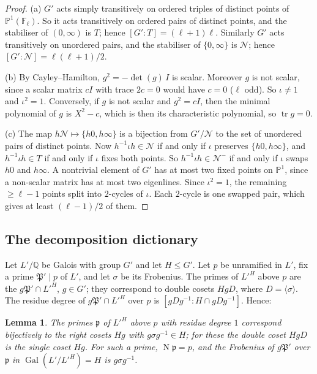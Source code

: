 \documentclass[11pt]{amsart}
\newtheorem{lemma}[theorem]{Lemma}
\theoremstyle{definition}
\theoremstyle{remark}
\newcommand{\Q}{\mathbb{Q}}
\newcommand{\F}{\mathbb{F}}
\newcommand{\PP}{\mathbb{P}}
\newcommand{\fp}{\mathfrak{p}}
\newcommand{\fP}{\mathfrak{P}}
\DeclareMathOperator{\Gal}{Gal}
\DeclareMathOperator{\tr}{tr}
\DeclareMathOperator{\Nm}{N}
\newcommand{\Nor}{\mathcal{N}}     %
\newcommand{\Nout}{\Nor^{-}}
\begin{document}
\begin{proof}
(a) $G'$ acts simply transitively on ordered triples of distinct points of $\PP^1(\F_\ell)$. So it acts transitively
on ordered pairs of distinct points, and the stabiliser of $(0,\infty)$ is $T$; hence $[G':T]=(\ell+1)\ell$. Similarly
$G'$ acts transitively on unordered pairs, and the stabiliser of $\{0,\infty\}$ is $\Nor$; hence $[G':\Nor]=\ell(\ell+1)/2$.

(b) By Cayley--Hamilton, $g^2=-\det(g)\,I$ is scalar. Moreover $g$ is not scalar, since a scalar matrix $cI$ with
trace $2c=0$ would have $c=0$ ($\ell$ odd). So $\iota\neq1$ and $\iota^2=1$. Conversely, if $g$ is not scalar and $g^2=cI$,
then the minimal polynomial of $g$ is $X^2-c$, which is then its characteristic polynomial, so $\tr g=0$.

(c) The map $h\Nor\mapsto\{h0,h\infty\}$ is a bijection from $G'/\Nor$ to the set of unordered pairs of distinct points.
Now $h^{-1}\iota h\in\Nor$ if and only if $\iota$ preserves $\{h0,h\infty\}$, and $h^{-1}\iota h\in T$ if and only if
$\iota$ fixes both points. So $h^{-1}\iota h\in\Nout$ if and only if $\iota$ swaps $h0$ and $h\infty$. A nontrivial
element of $G'$ has at most two fixed points on $\PP^1$, since a non-scalar matrix has at most two eigenlines. Since
$\iota^2=1$, the remaining $\ge\ell-1$ points split into $2$-cycles of $\iota$. Each $2$-cycle is one swapped pair,
which gives at least $(\ell-1)/2$ of them.
\end{proof}

\subsection{The decomposition dictionary}

Let $L'/\Q$ be Galois with group $G'$ and let $H\le G'$. Let $p$ be unramified in $L'$, fix a prime $\fP'\mid p$ of
$L'$, and let $\sigma$ be its Frobenius. The primes of $L'^H$ above $p$ are the $g\fP'\cap L'^H$, $g\in G'$; they
correspond to double cosets $HgD$, where $D=\langle\sigma\rangle$. The residue degree of $g\fP'\cap L'^H$ over $p$ is
$[gDg^{-1}:H\cap gDg^{-1}]$. Hence:

\begin{lemma}\label{lem:dict}
The primes $\fp$ of $L'^H$ above $p$ with residue degree $1$ correspond bijectively to the right cosets $Hg$ with
$g\sigma g^{-1}\in H$; for these the double coset $HgD$ is the single coset $Hg$. For such a prime, $\Nm\fp=p$, and the
Frobenius of $g\fP'$ over $\fp$ in $\Gal(L'/L'^H)=H$ is $g\sigma g^{-1}$.
\end{lemma}
\end{document}
